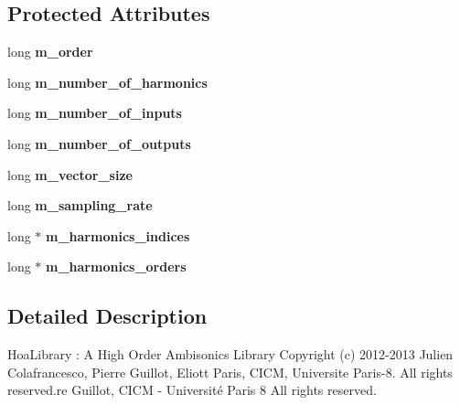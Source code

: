 \subsection*{Protected Attributes}
\begin{DoxyCompactItemize}
\item 
\hypertarget{class_ambisonic3_d_a3ea989a3583e2972139a363564711e2b}{long {\bfseries m\-\_\-order}}\label{class_ambisonic3_d_a3ea989a3583e2972139a363564711e2b}

\item 
\hypertarget{class_ambisonic3_d_aceadaee86c8d9ad770bbe00829e65804}{long {\bfseries m\-\_\-number\-\_\-of\-\_\-harmonics}}\label{class_ambisonic3_d_aceadaee86c8d9ad770bbe00829e65804}

\item 
\hypertarget{class_ambisonic3_d_ace03a703aad689dc3d48e95a9e4f4d06}{long {\bfseries m\-\_\-number\-\_\-of\-\_\-inputs}}\label{class_ambisonic3_d_ace03a703aad689dc3d48e95a9e4f4d06}

\item 
\hypertarget{class_ambisonic3_d_ad650b4479aa106e0914b5aa3634249a0}{long {\bfseries m\-\_\-number\-\_\-of\-\_\-outputs}}\label{class_ambisonic3_d_ad650b4479aa106e0914b5aa3634249a0}

\item 
\hypertarget{class_ambisonic3_d_a07817497c3dad9c59077fb41ec7e7078}{long {\bfseries m\-\_\-vector\-\_\-size}}\label{class_ambisonic3_d_a07817497c3dad9c59077fb41ec7e7078}

\item 
\hypertarget{class_ambisonic3_d_ac9aa7a4977de5f201ab2ee7e4cd9aec7}{long {\bfseries m\-\_\-sampling\-\_\-rate}}\label{class_ambisonic3_d_ac9aa7a4977de5f201ab2ee7e4cd9aec7}

\item 
\hypertarget{class_ambisonic3_d_a6956fcba4f28ef36e487ab84a003ab27}{long $\ast$ {\bfseries m\-\_\-harmonics\-\_\-indices}}\label{class_ambisonic3_d_a6956fcba4f28ef36e487ab84a003ab27}

\item 
\hypertarget{class_ambisonic3_d_a5da35d2fac8aee501c51fd57ec66b565}{long $\ast$ {\bfseries m\-\_\-harmonics\-\_\-orders}}\label{class_ambisonic3_d_a5da35d2fac8aee501c51fd57ec66b565}

\end{DoxyCompactItemize}


\subsection{Detailed Description}
Hoa\-Library \-: A High Order Ambisonics Library Copyright (c) 2012-\/2013 Julien Colafrancesco, Pierre Guillot, Eliott Paris, C\-I\-C\-M, Universite Paris-\/8. All rights reserved.\-re Guillot, C\-I\-C\-M -\/ Université Paris 8 All rights reserved.

